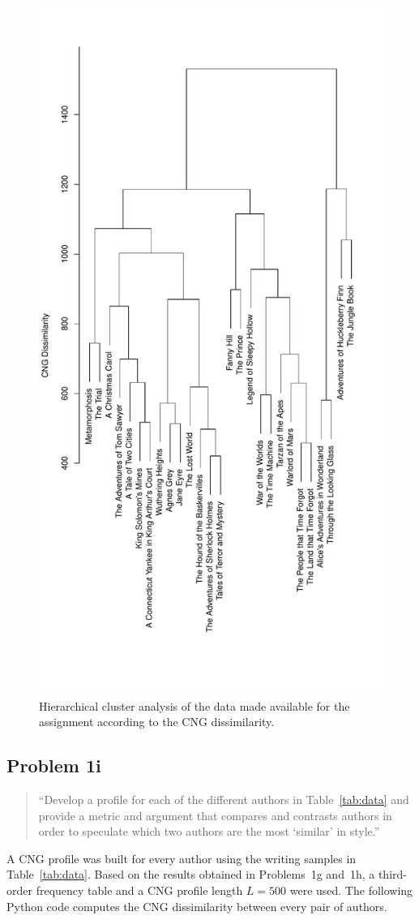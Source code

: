\documentclass[conference]{IEEEtran}
\newcommand{\codefile}[1]{
  \begin{framed}
  \fontsize{5.65}{6.78}\selectfont
  
  \end{framed}
}
\begin{document}
\begin{figure}[t]
\centering
\includegraphics[height=\textwidth,angle=270]{problem1h}
\caption{Hierarchical cluster analysis of the data made available for the assignment
according to the CNG dissimilarity.}
\label{fig:problem1h}
\end{figure}

\subsection{Problem 1i}

\begin{quote}
``Develop a profile for each of the different authors in Table~\ref{tab:data} and provide a metric and argument that compares and contrasts authors in order to speculate which two authors are the most `similar' in style.''
\end{quote}
\vspace{0.75em}

A CNG profile was built for every author using the writing samples in Table~\ref{tab:data}.
Based on the results obtained in Problems~1g and~1h, a third-order frequency table and a CNG profile length $L=500$ were used.
The following Python code computes the CNG dissimilarity between every pair of authors.

\codefile{problem1i.py}
\end{document}
